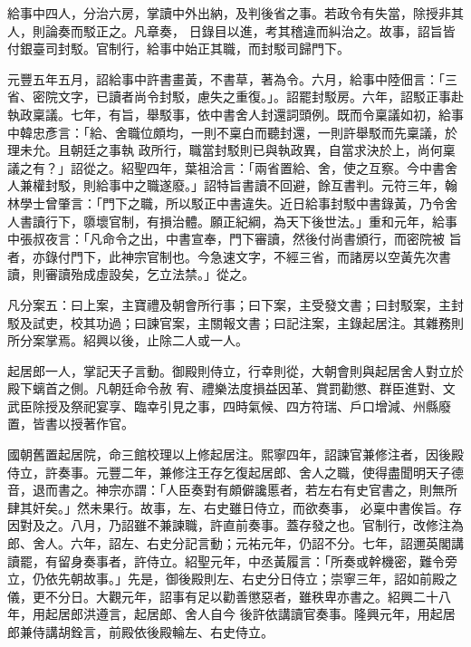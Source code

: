 \begin{pinyinscope}
 給事中四人，分治六房，掌讀中外出納，及判後省之事。若政令有失當，除授非其人，則論奏而駁正之。凡章奏，
 日錄目以進，考其稽違而糾治之。故事，詔旨皆付銀臺司封駁。官制行，給事中始正其職，而封駁司歸門下。



 元豐五年五月，詔給事中許書畫黃，不書草，著為令。六月，給事中陸佃言：「三省、密院文字，已讀者尚令封駁，慮失之重復。」。詔罷封駁房。六年，詔駁正事赴執政稟議。七年，有旨，舉駁事，依中書舍人封還詞頭例。既而令稟議如初，給事中韓忠彥言：「給、舍職位頗均，一則不稟白而聽封還，一則許舉駁而先稟議，於理未允。且朝廷之事執
 政所行，職當封駁則已與執政異，自當求決於上，尚何稟議之有？」詔從之。紹聖四年，葉祖洽言：「兩省置給、舍，使之互察。今中書舍人兼權封駁，則給事中之職遂廢。」詔特旨書讀不回避，餘互書判。元符三年，翰林學士曾肇言：「門下之職，所以駁正中書違失。近日給事封駁中書錄黃，乃令舍人書讀行下，隳壞官制，有損治體。願正紀綱，為天下後世法。」重和元年，給事中張叔夜言：「凡命令之出，中書宣奉，門下審讀，然後付尚書頒行，而密院被
 旨者，亦錄付門下，此神宗官制也。今急速文字，不經三省，而諸房以空黃先次書讀，則審讀殆成虛設矣，乞立法禁。」從之。



 凡分案五：曰上案，主寶禮及朝會所行事；曰下案，主受發文書；曰封駁案，主封駁及試吏，校其功過；曰諫官案，主關報文書；曰記注案，主錄起居注。其雜務則所分案掌焉。紹興以後，止除二人或一人。



 起居郎一人，掌記天子言動。御殿則侍立，行幸則從，大朝會則與起居舍人對立於殿下螭首之側。凡朝廷命令赦
 宥、禮樂法度損益因革、賞罰勸懲、群臣進對、文武臣除授及祭祀宴享、臨幸引見之事，四時氣候、四方符瑞、戶口增減、州縣廢置，皆書以授著作官。



 國朝舊置起居院，命三館校理以上修起居注。熙寧四年，詔諫官兼修注者，因後殿侍立，許奏事。元豐二年，兼修注王存乞復起居郎、舍人之職，使得盡聞明天子德音，退而書之。神宗亦謂：「人臣奏對有頗僻讒慝者，若左右有史官書之，則無所肆其奸矣。」然未果行。故事，左、右史雖日侍立，而欲奏事，
 必稟中書俟旨。存因對及之。八月，乃詔雖不兼諫職，許直前奏事。蓋存發之也。官制行，改修注為郎、舍人。六年，詔左、右史分記言動；元祐元年，仍詔不分。七年，詔邇英閣講讀罷，有留身奏事者，許侍立。紹聖元年，中丞黃履言：「所奏或幹機密，難令旁立，仍依先朝故事。」先是，御後殿則左、右史分日侍立；崇寧三年，詔如前殿之儀，更不分日。大觀元年，詔事有足以勸善懲惡者，雖秩卑亦書之。紹興二十八年，用起居郎洪遵言，起居郎、舍人自今
 後許依講讀官奏事。隆興元年，用起居郎兼侍講胡銓言，前殿依後殿輪左、右史侍立。




\end{pinyinscope}

